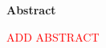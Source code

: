 \vspace*{2cm}

\begin{center}
    \textbf{Abstract}
\end{center}

\vspace*{1cm}

\noindent \textcolor{red}{ADD ABSTRACT}

